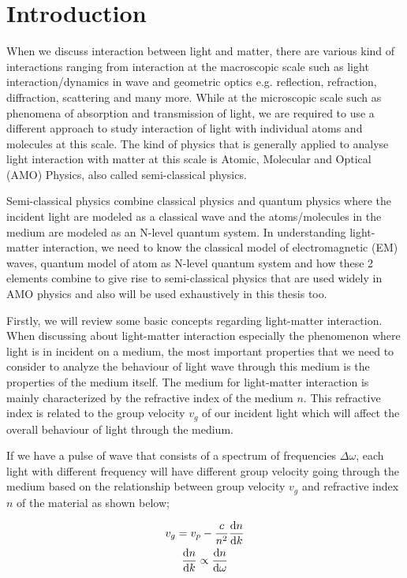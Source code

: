 \chapter{Introduction}
When we discuss interaction between light and matter, there are various kind of interactions ranging from interaction at the macroscopic scale such as light interaction/dynamics in wave and geometric optics e.g. reflection, refraction, diffraction, scattering and many more. While at the microscopic scale such as phenomena of absorption and transmission of light, we are required to use a different approach to study interaction of light with individual atoms and molecules at this scale. The kind of physics that is generally applied to analyse light interaction with matter at this scale is Atomic, Molecular and Optical (AMO) Physics, also called semi-classical physics.

Semi-classical physics combine classical physics and quantum physics where the incident light are modeled as a classical wave and the atoms/molecules in the medium are modeled as an N-level quantum system. In understanding light-matter interaction, we need to know the classical model of electromagnetic (EM) waves, quantum model of atom as N-level quantum system and how these 2 elements combine to give rise to semi-classical physics that are used widely in AMO physics and also will be used exhaustively in this thesis too.

Firstly, we will review some basic concepts regarding light-matter interaction. When discussing about light-matter interaction especially the phenomenon where light is in incident on a medium, the most important properties that we need to consider to analyze the behaviour of light wave through this medium is the properties of the medium itself. The medium for light-matter interaction is mainly characterized by the refractive index of the medium $n$. This refractive index is related to the group velocity $v_g$ of our incident light which will affect the overall behaviour of light through the medium.

If we have a pulse of wave that consists of a spectrum of frequencies $\Delta\omega$, each light with different frequency will have different group velocity going through the medium based on the relationship between group velocity $v_g$ and refractive index $n$ of the material as shown below;

\begin{gather}
	v_g = v_p - \frac{c}{n^2} \dv{n}{k} \label{eqn: groupVelocity}\\
	\dv{n}{k} \propto \dv{n}{\omega}
\end{gather}


